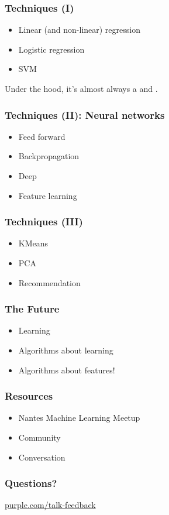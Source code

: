 \begin{frame}
  \frametitle{Techniques (I)}

  \begin{itemize}
  \item Linear (and non-linear) regression
  \item Logistic regression
  \item SVM
  \end{itemize}

  Under the hood, it's almost always a  and
  .
\end{frame}

\begin{frame}
  \frametitle{Techniques (II): Neural networks}

  \begin{itemize}
  \item Feed forward
  \item Backpropagation
  \item Deep
  \item Feature learning
  \end{itemize}
\end{frame}

\begin{frame}
  \frametitle{Techniques (III)}

  \begin{itemize}
  \item KMeans
  \item PCA
  \item Recommendation
  \end{itemize}
\end{frame}

\begin{frame}
  \frametitle{The Future}

  \begin{itemize}
  \item Learning
  \item Algorithms about learning
  \item Algorithms about features!
  \end{itemize}
\end{frame}

\begin{frame}
  \frametitle{Resources}

  \begin{itemize}
  \item Nantes Machine Learning Meetup
  \item Community
  \item Conversation
  \end{itemize}
\end{frame}


\begin{frame}
  \frametitle{Questions?}
  \centerline{\large\url{purple.com/talk-feedback}}
\end{frame}


